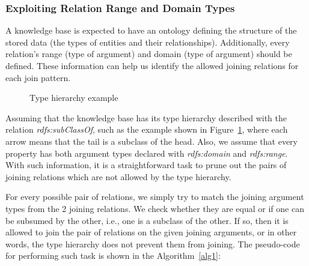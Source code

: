 \subsubsection{Exploiting Relation Range and Domain Types}

A knowledge base is expected to have an ontology defining the structure of the stored data (the types of entities and
their relationships). Additionally, every relation's range (type of  argument) and domain (type of 
argument) should be defined. These information can help us identify the allowed joining relations for each join
pattern.

\begin{figure}[h!]
  \caption{Type hierarchy example}
  \centering
  \label{fig:hierarchy}
\end{figure}

Assuming that the knowledge base has its type hierarchy described with the relation \emph{rdfs:subClassOf}, such as
the
example shown in Figure~\ref{fig:hierarchy}, where each arrow means that the tail is a subclass of the head. Also,
we assume that every property has both argument types declared with \emph{rdfs:domain} and \emph{rdfs:range}. With
such information, it is a straightforward task to prune out the pairs of joining relations which are not allowed by
the type hierarchy.    

For every possible pair of relations, we simply try to match the joining argument types from the 2 joining relations.
We
check whether they are equal or if one can be subsumed by the other, i.e., one is a subclass of the other. If so, then
it is allowed to join the pair of relations on the given joining arguments, or in other words, the type hierarchy does
not prevent them from joining. The pseudo-code for performing such task is shown in the Algorithm~\ref{alg1}:

